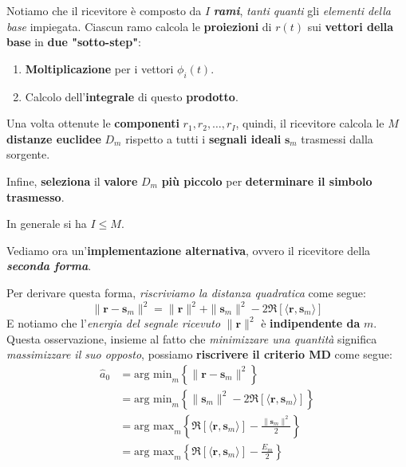 Notiamo che il ricevitore è composto da $I$ \textbf{\textit{rami}}, \textit{tanti quanti} gli
\textit{elementi della base} impiegata. Ciascun ramo calcola le \textbf{proiezioni} di $r(t)$
sui \textbf{vettori della base} in \textbf{due "sotto-step"}:
\begin{enumerate}
    \item \textbf{Moltiplicazione} per i vettori $\phi_i(t)$.
    \item Calcolo dell'\textbf{integrale} di questo \textbf{prodotto}.
\end{enumerate}

Una volta ottenute le \textbf{componenti} $r_{1},r_{2},\ldots ,r_I$, quindi, il ricevitore
calcola le $M$ \textbf{distanze euclidee} $D_m$ rispetto a tutti i \textbf{segnali ideali} $\mathbf{s}_m$
trasmessi dalla sorgente.

Infine, \textbf{seleziona} il \textbf{valore} $D_m$ \textbf{più piccolo} per
\textbf{determinare il simbolo trasmesso}.

\begin{warning}
    In generale si ha $I \le M$.
\end{warning}

Vediamo ora un'\textbf{implementazione alternativa}, ovvero il ricevitore
della \textbf{\textit{seconda forma}}.

Per derivare questa forma, \textit{riscriviamo la distanza quadratica} come segue:
\[
    \|\mathbf{r} - \mathbf{s}_m\|^2 = \|\mathbf{r}\|^2 + \|\mathbf{s}_m\|^2 
    -2 \Re [\langle \mathbf{r}, \mathbf{s}_m \rangle]
\]
E notiamo che l'\textit{energia del segnale ricevuto} $\|\mathbf{r}\|^2$ 
è \textbf{indipendente da} $m$. Questa osservazione, insieme al fatto che \textit{minimizzare una quantità}
significa \textit{massimizzare il suo opposto}, possiamo \textbf{riscrivere il criterio MD} come segue:
\[
    \begin{aligned}
        \hat{a}_0 &= \text{arg min}_m \left\{ \|\mathbf{r} - \mathbf{s}_m\|^2 \right\} \\ 
                  &= \text{arg min}_m \left\{ \|\mathbf{s}_m\|^2 
                  -2 \Re [\langle \mathbf{r}, \mathbf{s}_m \rangle] \right\} \\ 
                  &= \text{arg max}_m \left\{ \Re [\langle \mathbf{r}, \mathbf{s}_m \rangle]
                  - \frac{\|\mathbf{s}_m\|^2}{2} \right\} \\ 
                  &= \text{arg max}_m \left\{ \Re [\langle \mathbf{r}, \mathbf{s}_m \rangle]
                  - \frac{E_m}{2} \right\} \\ 
    \end{aligned}
\]

